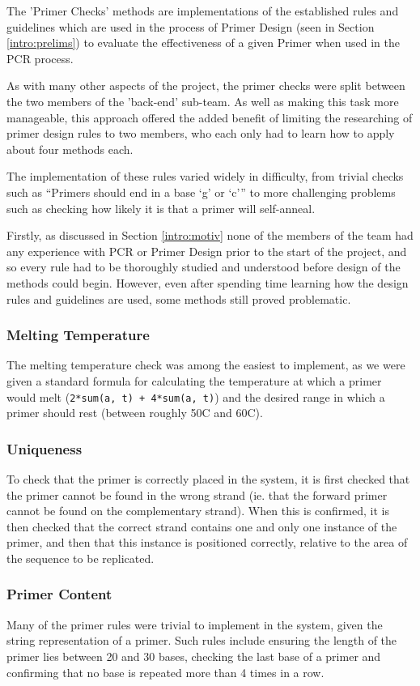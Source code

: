 The 'Primer Checks' methods are implementations of the established rules
and guidelines which are used in the process of Primer Design (seen in
Section \ref{intro:prelims}) to evaluate the effectiveness of a given 
Primer when used in the PCR process.

As with many other aspects of the project, the primer checks were split
between the two members of the 'back-end' sub-team. As well as making
this task more manageable, this approach offered the added benefit of
limiting the researching of primer design rules to two members, who each
only had to learn how to apply about four methods each.

The implementation of these rules varied widely in difficulty, from
trivial checks such as ``Primers should end in a base `g' or `c''' to
more challenging problems such as checking how likely it is that a primer  
will self-anneal.

Firstly, as discussed in Section \ref{intro:motiv} none of the members of 
the team had any experience with PCR or Primer Design prior to the start of 
the project, and so every rule had to be thoroughly studied and understood 
before design of the methods could begin. However, even after spending time 
learning how the design rules and guidelines are used, some methods still 
proved problematic.

\subsubsection{Melting Temperature}
The melting temperature check was among the easiest to implement, as we
were given a standard formula for calculating the temperature at which a 
primer would melt (\texttt{2*sum(a, t) + 4*sum(a, t)}) and the desired 
range in which a primer should rest (between roughly 50\degree C and 
60\degree C).

\subsubsection{Uniqueness}
To check that the primer is correctly placed in the system, it is first checked
that the primer cannot be found in the wrong strand (ie. that the forward
primer cannot be found on the complementary strand). When this is confirmed,
it is then checked that the correct strand contains one and only one instance
of the primer, and then that this instance is positioned correctly, relative
to the area of the sequence to be replicated.

\subsubsection{Primer Content}
Many of the primer rules were trivial to implement in the system, given
the string representation of a primer. Such rules include ensuring the
length of the primer lies between 20 and 30 bases, checking the last base
of a primer and confirming that no base is repeated more than 4 times
in a row. 

